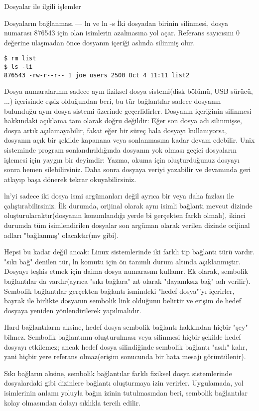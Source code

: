 \documentclass[10pt,a5paper]{book}
\begin{document}
\begin{section}{Dosyalar ile ilgili işlemler}
\begin{subsection}{Dosyaların bağlanması — ln ve ln -s}
İki dosyadan birinin silinmesi, dosya numarası 876543 için olan isimlerin azalmasına yol açar. Referans sayıcısını 0 değerine ulaşmadan önce dosyanın içeriği aslında silinmiş olur.
\begin{verbatim}
$ rm list
$ ls -li
876543 -rw-r--r-- 1 joe users 2500 Oct 4 11:11 list2
\end{verbatim}
Dosya numaralarının sadece aynı fiziksel dosya sistemi(disk bölümü, USB sürücü, ...) içerisinde eşsiz olduğundan beri, bu tür bağlantılar sadece dosyanın bulunduğu aynı dosya sistemi üzerinde geçerlidirler.
Dosyanın içeriğinin silinmesi hakkındaki açıklama tam olarak doğru değildir: Eğer son dosya adı silinmişse, dosya artık açılamayabilir, fakat eğer bir süreç hala dosyayı kullanıyorsa, dosyanın açık bir şekilde kapanana veya sonlanmasına kadar devam edebilir. Unix sisteminde program sonlandırıldığında dosyanın yok olması geçici dosyaların işlemesi için yaygın bir deyimdir: Yazma, okuma için oluşturduğunuz dosyayı sonra hemen silebilirsiniz. Daha sonra dosyaya veriyi yazabilir ve devamında geri atlayıp başa dönerek tekrar okuyabilirsiniz.

ln'yi sadece iki dosya ismi argümanları değil ayrıca bir veya daha fazlası ile çalıştırabilirsiniz. İlk durumda, orijinal olarak aynı isimli bağlantı mevcut dizinde oluşturulacaktır(dosyanın konumlandığı yerde bi gerçekten farklı olmalı), ikinci durumda tüm isimlendirilen dosyalar son argüman olarak verilen dizinde orijinal adları "bağlanmış" olacaktır(mv gibi).

Hepsi bu kadar değil ancak: Linux sistemlerinde iki farklı tip bağlantı türü vardır. "sıkı bağ" denilen tür, ln komutu için ön tanımlı durum altında açıklanmıştır. Dosyayı teşhis etmek için daima dosya numarasını kullanır. Ek olarak, sembolik bağlantılar da vardır(ayrıca "sıkı bağlara" zıt olarak "dayanıksız bağ" adı verilir). Sembolik bağlantılar gerçekten  bağlantı ismindeki "hedef dosya"'yı içerirler, bayrak ile birlikte dosyanın sembolik link olduğunu belirtir ve erişim de hedef dosyaya yeniden yönlendirilerek yapılmalıdır.

Hard bağlantıların aksine, hedef dosya sembolik bağlantı hakkından hiçbir "şey" bilmez. Sembolik bağlantının oluşturulması veya silinmesi hiçbir şekilde hedef dosyayı etkilemez; ancak hedef dosya silindiğinde sembolik bağlantı "asılı" kalır, yani hiçbir yere referans olmaz(erişim sonucunda bir hata mesajı görüntülenir).

Sıkı bağların aksine, sembolik bağlantılar farklı fiziksel dosya sistemlerinde dosyalardaki gibi dizinlere bağlantı oluşturmaya izin verirler. Uygulamada, yol isimlerinin anlamı yoluyla bağın izinin tutulmasından beri, sembolik bağlantılar kolay olmasından dolayı sıklıkla tercih edilir.


\end{subsection}
\end{section}
\end{document}
